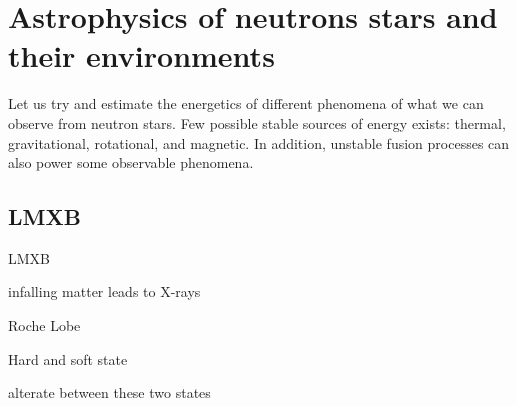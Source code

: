 \chapter{Astrophysics of neutrons stars and their environments}


Let us try and estimate the energetics of different phenomena of what we can observe from neutron stars.
Few possible stable sources of energy exists: thermal, gravitational, rotational, and magnetic.
In addition, unstable fusion processes can also power some observable phenomena.







\section{LMXB}

LMXB \cite{TH06}

infalling matter leads to X-rays \cite{Lewin93}

Roche Lobe \cite{PRP02} \cite{LL15}

Hard and soft state \cite{HvdK89}

alterate between these two states \cite{MDF14} \cite{DGK07}



